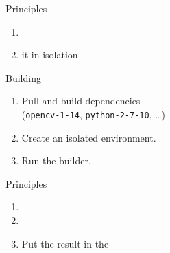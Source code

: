 \documentclass[aspectratio=169]{beamer}
\newcommand{\couleur}[2]{{\color{#1}{#2}}}
\begin{document}
\begin{frame}
    \begin{block}{Principles}
        \begin{enumerate}
            \item \couleur{dark-grey}{Describe a package and its
                dependencies in full}
            \item
                \couleur{blue-portage}{Build} it in isolation
        \end{enumerate}
    \end{block}
\end{frame}

\begin{frame}{Building}
    \couleur{green-pea}{gh-from-shoe-1.0\$}\ \couleur{blue-marguerite}{nix build}
    \begin{enumerate}
        \item Pull and build dependencies\\
            (\lstinline+opencv-1-14+, \lstinline+python-2-7-10+, \ldots)
        \item Create an isolated environment.
        \item Run the builder.
    \end{enumerate}
\end{frame}

\begin{frame}
    \begin{block}{Principles}
        \begin{enumerate}
            \item
                \couleur{dark-grey}{Describe a package and its
                dependencies in full}
            \item
                \couleur{dark-grey}{Build it in isolation}
            \item
                Put the result in the
                \couleur{orange-vivid-tangerine}{store}
        \end{enumerate}
    \end{block}
\end{frame}
\end{document}

